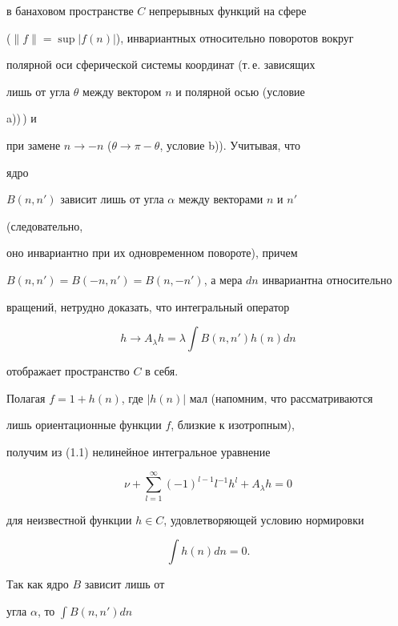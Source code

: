 в банаховом пространстве $C$ непрерывных функций на сфере  


($\|f\|=\sup|f(n)|$), инвариантных относительно поворотов вокруг  


полярной оси сферической системы координат (т.\,е. зависящих  


лишь от угла $\theta$ между вектором $n$ и полярной осью (условие 


a))\,) и  


при замене $n\to -n$ ($\theta\to\pi-\theta$, условие b)). Учитывая, что 


ядро  


$B(n,n')$ зависит лишь от угла $\alpha$ между векторами $n$ и $n'$ 


(следовательно, 


оно инвариантно при их одновременном повороте), причем 


$B(n,n')=B(-n,n')=B(n,-n')$, а мера $dn$ инвариантна относительно  


вращений, нетрудно доказать, что интегральный оператор 


$$ 


h\to A_\lambda h=\lambda\int B(n,n')h(n)dn 


$$ 


отображает пространство $C$ в себя. 


 


Полагая $f=1+h(n)$, где $|h(n)|$ мал (напомним, что рассматриваются 


лишь ориентационные функции $f$, близкие к изотропным), 


получим из (1.1) нелинейное интегральное уравнение 


\begin{equation} 


\nu+\sum^\infty_{l=1}(-1)^{l-1}l^{-1}h^l+ 


A_\lambda h=0\tag{2.1} 


\end{equation} 


для неизвестной функции $h\in C$, удовлетворяющей условию нормировки 


\begin{equation} 


\int h(n)dn=0.\tag{2.2} 


\end{equation} 


Так как ядро $B$ зависит лишь от 


угла $\alpha$, то $\int B(n,n')dn$ 


